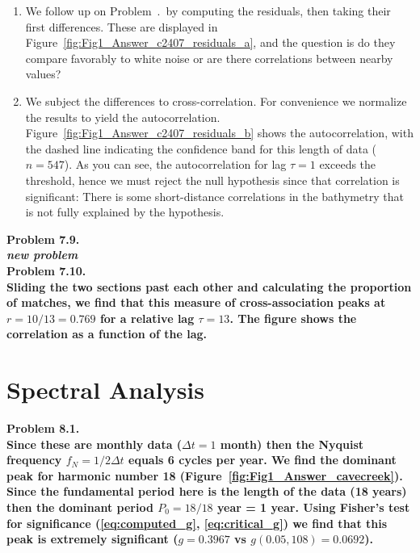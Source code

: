 \begin{enumerate}[label=\alph*)]
\item We follow up on Problem~\theConradchap.\theConrad\ by computing the residuals, then taking their first differences.
These are displayed in Figure~\ref{fig:Fig1_Answer_c2407_residuals_a}, and the question is do they compare favorably to white noise
or are there correlations between nearby values?
\item We subject the differences to cross-correlation.  For convenience we normalize the results to yield the autocorrelation.
Figure~\ref{fig:Fig1_Answer_c2407_residuals_b} shows the autocorrelation, with the dashed line indicating the confidence band for
this length of data ($n = 547$).  As you can see, the autocorrelation for lag $\tau = 1$ exceeds the threshold,
hence we must reject the null hypothesis since that correlation is significant: There is some short-distance correlations in the
bathymetry that is not fully explained by the hypothesis.
\end{enumerate}

\noindent
\bf{Problem 7.9.} \\

{\it new problem}\\

\noindent
\bf{Problem 7.10.} \\

Sliding the two sections past each other and calculating the proportion of matches, we find that
this measure of cross-association peaks at $r = 10/13 = 0.769$ for a relative lag $\tau = 13$.
The figure shows the correlation as a function of the lag.

\section{Spectral Analysis}

\noindent
\bf{Problem 8.1.} \\

Since these are monthly data ($\Delta t = 1$ month) then the Nyquist frequency $f_N = 1/2\Delta t$ equals
6 cycles per year.  We find the dominant peak for harmonic number 18 (Figure~\ref{fig:Fig1_Answer_cavecreek}).
Since the fundamental period here
is the length of the data (18 years) then the dominant period $P_0 = 18/18$ year = 1 year. Using Fisher's
test for significance (\ref{eq:computed_g}, \ref{eq:critical_g}) we find that this peak
is extremely significant ($g = 0.3967$ vs $g(0.05,108) = 0.0692$). \\


